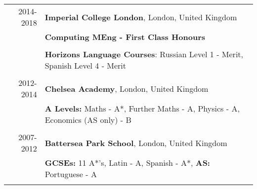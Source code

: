 \documentclass[a4paper,10pt]{article}
\begin{document}
	\begin{tabular}{rl}	
		2014-2018 & \textbf{Imperial College London}, London, United Kingdom \\& 
		\textbf{Computing MEng - First Class Honours} \\&\\& 
		\textbf{Horizons Language Courses}: Russian Level 1 - Merit, Spanish Level 4 - Merit

		 \\\multicolumn{2}{c}{} \\
		
		2012-2014 & \textbf{Chelsea Academy}, London, United Kingdom \\&
		\textbf{A Levels:}
		Maths - A*, Further Maths - A, Physics - A, Economics (AS only) - B 
		\\\multicolumn{2}{c}{} \\
		
		2007-2012 & \textbf{Battersea Park School}, London, United Kingdom \\& 
		\textbf{GCSEs:} 11 A*'s, Latin - A, Spanish - A*, \textbf{AS:} Portuguese - A
		\\\multicolumn{2}{c}{} \\
	
	\end{tabular}
	
	

	
	
	
\end{document}
